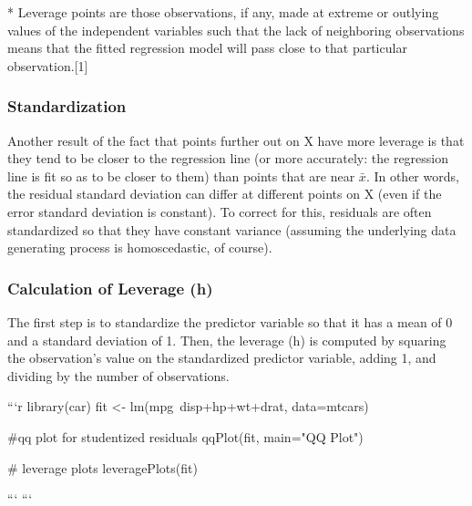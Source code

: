 * Leverage points are those observations, if any, made at extreme or outlying values of the independent variables such that the lack of neighboring observations means that the fitted regression model will pass close to that particular observation.[1]




\subsubsection{Standardization}
Another result of the fact that points further out on X have more leverage is that they tend to be closer to the regression line (or more accurately: the regression line is fit so as to be closer to them) than points that are near $\bar{x}$. In other words, the residual standard deviation can differ at different points on X (even if the error standard deviation is constant). To correct for this, residuals are often standardized so that they have constant variance (assuming the underlying data generating process is homoscedastic, of course).


\subsubsection{Calculation of Leverage (h)}
The first step is to standardize the predictor variable so that it has a mean of 0 and a standard deviation of 1. 
Then, the leverage (h) is computed by squaring the observation's value on the standardized predictor variable, adding 1, 
and dividing by the number of observations.

\newpage


```{r}
library(car)
fit <- lm(mpg~disp+hp+wt+drat, data=mtcars) 

#qq plot for studentized residuals
qqPlot(fit, main="QQ Plot")  

# leverage plots
leveragePlots(fit) 

```
```

